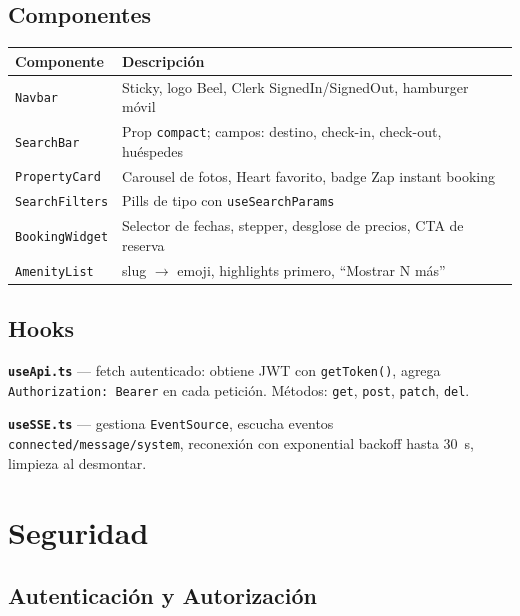 \documentclass[12pt,a4paper]{report}
\begin{document}
\section{Componentes}

\begin{center}
\begin{tabularx}{\textwidth}{L{4cm} X}
\toprule
\textbf{Componente} & \textbf{Descripci\'on} \\
\midrule
\texttt{Navbar} & Sticky, logo Beel, Clerk SignedIn/SignedOut, hamburger m\'ovil \\
\texttt{SearchBar} & Prop \texttt{compact}; campos: destino, check-in, check-out, hu\'espedes \\
\texttt{PropertyCard} & Carousel de fotos, Heart favorito, badge Zap instant booking \\
\texttt{SearchFilters} & Pills de tipo con \texttt{useSearchParams} \\
\texttt{BookingWidget} & Selector de fechas, stepper, desglose de precios, CTA de reserva \\
\texttt{AmenityList} & slug $\rightarrow$ emoji, highlights primero, ``Mostrar N m\'as'' \\
\bottomrule
\end{tabularx}
\end{center}

\section{Hooks}

\textbf{\texttt{useApi.ts}} --- fetch autenticado: obtiene JWT con \texttt{getToken()},
agrega \texttt{Authorization: Bearer} en cada petici\'on. M\'etodos: \texttt{get},
\texttt{post}, \texttt{patch}, \texttt{del}.

\textbf{\texttt{useSSE.ts}} --- gestiona \texttt{EventSource}, escucha eventos
\texttt{connected/message/system}, reconexión con exponential backoff hasta 30~s,
limpieza al desmontar.

\chapter{Seguridad}

\section{Autenticaci\'on y Autorizaci\'on}
\end{document}
